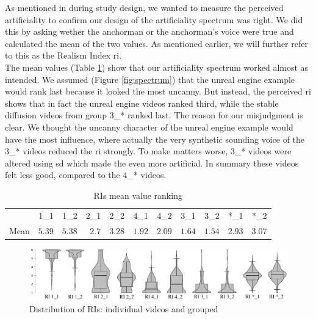 \documentclass[
  a4paper,  %
  twoside,  %
  bibliography=totoc,
  headsepline,
  cleardoublepage=empty,
  parskip=half,
  draft=false
]{scrbook}
\begin{document}
As mentioned in during study design, we wanted to measure the perceived artificiality to confirm our design of the artificiality spectrum was right. We did this by asking wether the anchorman or the anchorman's voice were true and calculated the mean of the two values. As mentioned earlier, we will further refer to this as the Realism Index \gls{ri}. \\
The mean values (Table \ref{tab:RIs-mean}) show that our artificiality spectrum worked almost as intended. We assumed (Figure \ref{fig:spectrum}) that the unreal engine example would rank last because it looked the most uncanny. But instead, the perceived \gls{ri} shows that in fact the unreal engine videos ranked third, while the stable diffusion videos from group 3\_* ranked last. The reason for our misjudgment is clear. We thought the uncanny character of the unreal engine example would have the most influence, where actually the very synthetic sounding voice of the 3\_* videos reduced the \gls{ri} strongly. To make matters worse, 3\_* videos were altered using \gls{sd} which made the even more artificial. In summary these videos felt less good, compared to the 4\_* videos. 

\begin{table}[h]
	\centering
	\caption{RIs mean value ranking}
	\label{tab:RIs-mean}
	{
		\begin{tabular}{lrrrrrrrrrr}
			\toprule
			 & 1\_1 & 1\_2 & 2\_1 & 2\_2 & 4\_1 & 4\_2 & 3\_1 & 3\_2 & *\_1 & *\_2 \\
			\cmidrule[0.4pt]{1-11}
			Mean & $5.39$ & $5.38$ & $2.7$ & $3.28$ & $1.92$ & $2.09$ & $1.64$ & $1.54$  & $2.93$ & $3.07$\\
			\bottomrule
		\end{tabular}
	}
\end{table}
\begin{figure}[h]
  \includegraphics[width=1\textwidth]{graphics/images/statistics/RIs/RI_compilation.png}
  \caption{Distribution of RIs: individual videos and grouped}
  \label{fig:all-RIs}
\end{figure}
\end{document}

